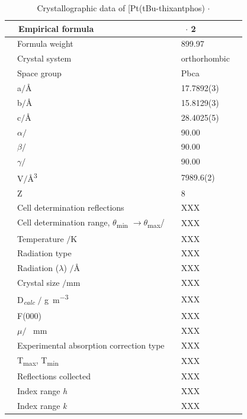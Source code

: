 \begin{table}[htp]
\caption[Crystallographic data of [Pt(tBu-thixantphos)\ce{O2}{]} $\cdot{}$ ]{Crystallographic data of [Pt(tBu-thixantphos)\ce{O2}{]} $\cdot{}$ } 
\label{table:crystaldioxygen:data}
\begin{center}
\begin{tabular}{l l}
	\toprule{}
	~~\bfseries{Empirical formula}~~&~~\ce{C30H46O3P2PtS} $\cdot{}$ 2\ce{C6H6}\\
	\midrule{}	
	~~Formula weight~~		&~~899.97~~	\\
	~~Crystal system~~		&~~orthorhombic~~	\\
	~~Space group~~		&~~Pbca~~	\\
	~~a$/$\si{\angstrom}~~	&~~17.7892(3)~~	\\
	~~b$/$\si{\angstrom}~~	&~~15.8129(3)~~	\\
	~~c$/$\si{\angstrom}~~	&~~28.4025(5)~~	\\
	~~$\alpha/$\degrees~~	&~~90.00~~	\\
	~~$\beta/$\degrees~~	&~~90.00~~	\\
	~~$\gamma/$\degrees~~	&~~90.00~~	\\
	~~V$/$\si{\angstrom\cubed}&~~7989.6(2)~~	\\
	~~Z					&~~8~~	\\
	~~Cell determination reflections &~~XXX~~	\\
	~~Cell determination range, $\theta{}$\textsubscript{min} $\longrightarrow \theta{}$\textsubscript{max}/\degrees &~~XXX~~	\\
	~~Temperature $/$\si{\kelvin}	&~~XXX~~	\\
	~~Radiation type			&~~XXX~~	\\
	~~Radiation ($\lambda$) $/$\si{\angstrom}	&~~XXX~~	\\
	~~Crystal size $/$\si{\milli\metre}			&~~XXX~~	\\
	~~D\textsubscript{\emph{calc}} $/$ \si{\gram\per\metre\cubed}	&~~XXX~~	\\
	~~F(000)				&~~XXX~~	\\
	~~$\mu /$	\si{\per\milli\metre}		&~~XXX~~	\\
	~~Experimental absorption correction type	&~~XXX~~	\\
	~~T\textsubscript{max}, T\textsubscript{min}	&~~XXX~~	\\
	~~Reflections collected					&~~XXX~~	\\
	~~Index range \emph{h}		&~~XXX~~	\\
	~~Index range \emph{k}		&~~XXX~~	\\

\end{tabular}
\end{center}
\end{table}
